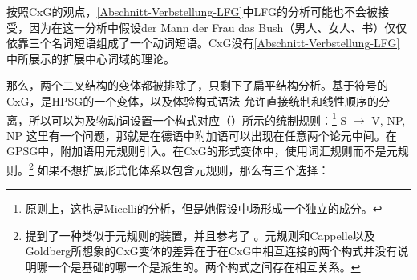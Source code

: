 按照CxG的观点，\ref{Abschnitt-Verbstellung-LFG}中LFG的分析可能也不会被接受，因为在这一分析中假设der Mann der Frau das Bush（男人、女人、书）仅仅依靠三个名词短语组成了一个动词短语。CxG没有\ref{Abschnitt-Verbstellung-LFG}中所展示的扩展中心词域的理论。

那么，两个二叉结构的变体都被排除了，只剩下了扁平结构分析。基于符号的CxG，是HPSG的一个变体\citep[]{Sag2010b}，以及体验构式语法 \citep[]{BC2005a}允许直接统制和线性顺序的分离，所以可以为及物动词设置一个构式对应（）所示的统制规则：\footnote{%
	原则上，这也是Micelli的分析，但是她假设中场形成一个独立的成分。%
}
\ea
S $\to$ V, NP, NP
\z
这里有一个问题，那就是在德语中附加语可以出现在任意两个论元中间。在GPSG中，附加语用元规则引入。在CxG的形式变体中，使用词汇规则而不是元规则。\footnote{\label{fn-allostructions}%
   \citet[]{Goldberg2014a}提到了一种类似于元规则的装置，并且参考了 。元规则和Cappelle以及Goldberg所想象的CxG变体的差异在于在CxG中相互连接的两个构式并没有说明哪一个是基础的哪一个是派生的。两个构式之间存在相互关系。%
} 如果不想扩展形式化体系以包含元规则，那么有三个选择：
